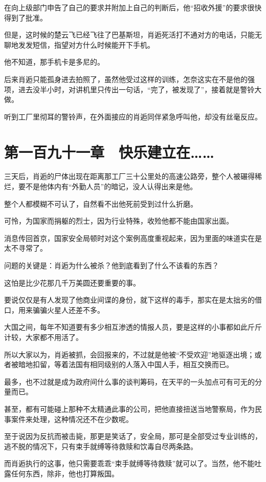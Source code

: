在向上级部门申告了自己的要求并附加上自己的判断后，他“招收外援”的要求很快得到了批准。

但是，这时候的楚云飞已经飞往了巴基斯坦，肖逅死活打不通对方的电话，只能无聊地发发短信，指望对方什么时候能开下手机。

他不知道，那手机卡是多尼的。

后来肖逅只能孤身进去拍照了，虽然他受过这样的训练，怎奈这实在不是他的强项，进去没半小时，对讲机里只传出一句话，“完了，被发现了”，接着就是警铃大做。

听到工厂里彻耳的警铃声，在外面接应的肖逅同伴紧急呼叫他，却没有丝毫反应。

\section{第一百九十一章　快乐建立在……}

三天后，肖逅的尸体出现在距离那工厂三十公里处的高速公路旁，整个人被碾得稀烂，要不是他体内有“外勤人员”的暗记，没人认得出来是他。

整个人都模糊不可认了，自然看不出他死前受到过什么折磨。

可怜，为国家而捐躯的烈士，因为行业特殊，收殓他都不能由国家出面。

消息传回首京，国家安全局顿时对这个案例高度重视起来，因为里面的味道实在是太不寻常了。

问题的关键是：肖逅为什么被杀？他到底看到了什么不该看的东西？

这怕是比少花那几千万美圆还要重要的事。

要说仅仅是有人发现了他商业间谍的身份，就下这样的毒手，那实在是太拙劣的借口，用来骗骗火星人还差不多。

大国之间，每年不知道要有多少相互渗透的情报人员，要是这样的小事都如此斤斤计较，大家都不用活了。

所以大家以为，肖逅被抓，会回报来的，不过就是他被“不受欢迎”地驱逐出境；或者被暗地扣留，等着法国有相同级别的人落入中国人手，相互交换而已。

最多，也不过就是成为政府间什么事的谈判筹码，在天平的一头加点可有可无的分量而已。

甚至，都有可能碰上那种不太精通此事的公司，把他直接扭送当地警察局，作为民事案件来处理，这种情况还不在少数呢。

至于说因为反抗而被击毙，那更是笑话了，安全局，那可是全部受过专业训练的，逃不脱的情况下，只有束手就缚等待救赎和饮毒自尽两条路。

而肖逅执行的这事，他只需要乖乖“束手就缚等待救赎”就可以了。当然，他不能吐露任何东西，除非，他也打算叛国。

